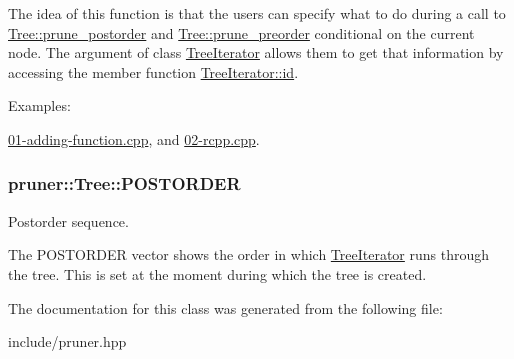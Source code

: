 The idea of this function is that the users can specify what to do during a call to \hyperlink{classpruner_1_1Tree_a7d465880d18acf79f3a772ea5412b0d7}{Tree\+::prune\+\_\+postorder} and \hyperlink{classpruner_1_1Tree_ac85bfb083b3856e65987e1d15885a61c}{Tree\+::prune\+\_\+preorder} conditional on the current node. The argument of class \hyperlink{classpruner_1_1TreeIterator}{Tree\+Iterator} allows them to get that information by accessing the member function \hyperlink{classpruner_1_1TreeIterator_ae76ec4f2c1390d72889f78a51d65d19c}{Tree\+Iterator\+::id}. \begin{Desc}
\item[Examples\+: ]\par
\hyperlink{01-adding-function_8cpp-example}{01-\/adding-\/function.\+cpp}, and \hyperlink{02-rcpp_8cpp-example}{02-\/rcpp.\+cpp}.\end{Desc}
\subsubsection[{\texorpdfstring{P\+O\+S\+T\+O\+R\+D\+ER}{POSTORDER}}]{ pruner\+::\+Tree\+::\+P\+O\+S\+T\+O\+R\+D\+ER\hspace{0.3cm}{\ttfamily [protected]}}\hypertarget{classpruner_1_1Tree_a547937e845fdbceafae4db25cd74f880}{}\label{classpruner_1_1Tree_a547937e845fdbceafae4db25cd74f880}


Postorder sequence. 

The P\+O\+S\+T\+O\+R\+D\+ER vector shows the order in which \hyperlink{classpruner_1_1TreeIterator}{Tree\+Iterator} runs through the tree. This is set at the moment during which the tree is created. 

The documentation for this class was generated from the following file\+:\begin{DoxyCompactItemize}
\item 
include/pruner.\+hpp\end{DoxyCompactItemize}
